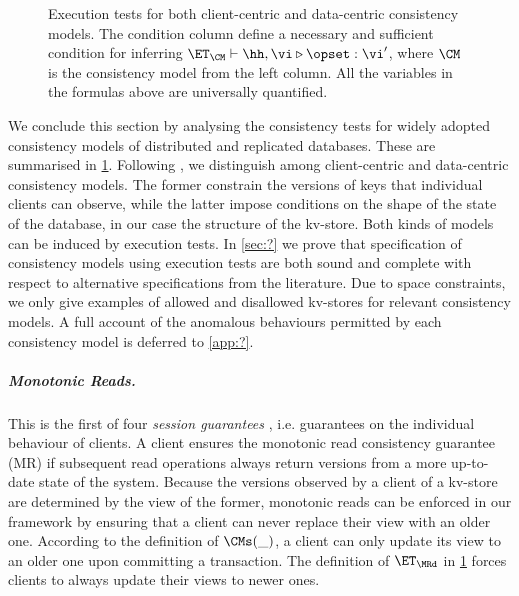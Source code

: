 \begin{figure}
\begin{tabular}{| lr |}
\end{tabular}
\caption{Execution tests for both client-centric and data-centric consistency models. 
The condition column define a necessary and sufficient condition for inferring $\ET_{\CM} \vdash \hh, \vi \triangleright \opset : \vi'$,  
where $\CM$ is the consistency model from the left column.
All the variables in the formulas above are universally quantified.}
\label{fig:execution.tests}
\end{figure}

We conclude this section by analysing the consistency tests for widely adopted 
consistency models of distributed and replicated databases. These are summarised 
in \cref{fig:execution.tests}.
Following \cite{}, we distinguish among client-centric and data-centric consistency models. 
The former constrain the versions of keys that individual clients can observe, while the latter 
impose conditions on the shape of the state of the database, in our case the structure of 
the kv-store. Both kinds of models can be induced by execution tests. In \cref{sec:?} 
we prove that specification of consistency models using execution tests are both sound and complete 
with respect to alternative specifications from the literature. Due to space constraints, we only give 
examples of allowed and disallowed kv-stores for relevant consistency models. A full account 
of the anomalous behaviours permitted by each consistency model is deferred to \cref{app:?}.

\subparagraph{Monotonic Reads.} 
This is the first of four \emph{session guarantees} \cite{terry1994sessions}, i.e. guarantees on the individual behaviour of 
clients.  A client ensures the monotonic read consistency guarantee (MR) if subsequent read operations always 
return versions from a more up-to-date state of the system. Because the versions observed by a client of a kv-store 
are determined by the view of the former, monotonic reads can be enforced in our framework by ensuring that 
a client can never replace their view with an older one. According to the definition of $\CMs(\_)$, 
a client can only update its view to an older one upon committing a transaction. The definition of 
$\ET_{\MRd}$ in \cref{fig:execution.tests} forces clients to always update their views to newer ones.

